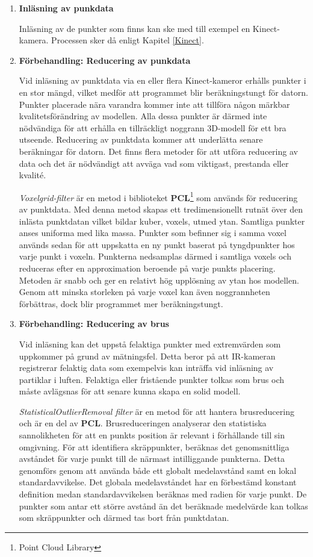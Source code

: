 \documentclass[a4paper,12pt,oneside,final]{extbook}
\begin{document}
\begin{enumerate}
\item \textbf{Inläsning av punkdata}

Inläsning av de punkter som finns kan ske med till exempel en Kinect-kamera. Processen sker då enligt Kapitel \ref{Kinect}.

\item \textbf{Förbehandling: Reducering av punkdata}

Vid inläsning av punktdata via en eller flera Kinect-kameror erhålls punkter i en stor mängd, vilket medför att programmet blir beräkningstungt för datorn. Punkter placerade nära varandra kommer inte att tillföra någon märkbar kvalitetsförändring av modellen. Alla dessa punkter är därmed inte nödvändiga för att erhålla en tillräckligt noggrann 3D-modell för ett bra utseende. Reducering av punktdata kommer att underlätta senare beräkningar för datorn. Det finns flera metoder för att utföra reducering av data och det är nödvändigt att avväga vad som viktigast, prestanda eller kvalité.\cite{cluster}

\emph{Voxelgrid-filter} är en metod i biblioteket \textbf{PCL}\footnote{Point Cloud Library} som används för reducering av punktdata. Med denna metod skapas ett tredimensionellt rutnät över den inlästa punktdatan vilket bildar kuber, voxels, utmed ytan. Samtliga punkter anses uniforma med lika massa. Punkter som befinner sig i samma voxel används sedan för att uppskatta en ny punkt baserat på tyngdpunkter hos varje punkt i voxeln. Punkterna nedsamplas därmed i samtliga voxels och reduceras efter en approximation beroende på varje punkts placering. Metoden är snabb och ger en relativt hög upplösning av ytan hos modellen. Genom att minska storleken på varje voxel kan även noggrannheten förbättras, dock blir programmet mer beräkningstungt.
\cite{pclvoxel}


\item \textbf{Förbehandling: Reducering av brus}

Vid inläsning kan det uppstå felaktiga punkter med extremvärden som uppkommer på grund av mätningsfel. Detta beror på att IR-kameran registrerar felaktig data som exempelvis kan inträffa vid inläsning av partiklar i luften. Felaktiga eller fristående punkter tolkas som brus och måste avlägsnas för att senare kunna skapa en solid modell.

\emph{StatisticalOutlierRemoval filter} är en metod för att hantera brusreducering och är en del av \textbf{PCL}. Brusreduceringen analyserar den statistiska sannolikheten för att en punkts position är relevant i förhållande till sin omgivning. För att identifiera skräppunkter, beräknas det genomsnittliga avståndet för varje punkt till de närmast intilliggande punkterna. Detta genomförs genom att använda både ett globalt medelavstånd samt en lokal standardavvikelse. Det globala medelavståndet har en förbestämd konstant definition medan standardavvikelsen beräknas med radien för varje punkt. De punkter som antar ett större avstånd än det beräknade medelvärde kan tolkas som skräppunkter och därmed tas bort från punktdatan\cite{cluster}.


\end{enumerate}
\end{document}
